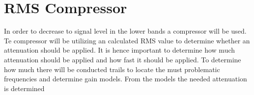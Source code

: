 \chapter{RMS Compressor}

In order to decrease to signal level in the lower bands a compressor will be used. Te compressor will be utilizing an calculated RMS value to determine whether an attenuation should be applied. It is hence important to determine how much attenuation should be applied and how fast it should be applied. To determine how much there will be conducted trails to locate the must problematic frequencies and determine gain models. From the models the needed attenuation is determined 





%